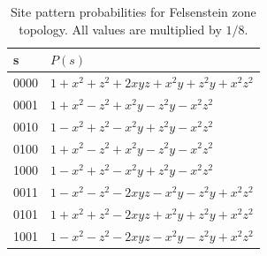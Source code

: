 \documentclass[a4paper]{article}
\begin{document}
\begin{table}
\centering
\begin{tabular}{|l|l|}
    \hline
s   &$P(s)$\\
    \hline
0000&$1+x^2+z^2+2xyz+x^2y+z^2y+x^2z^2$\\
0001&$1+x^2-z^2+x^2y-z^2y-x^2z^2$\\
0010&$1-x^2+z^2-x^2y+z^2y-x^2z^2$\\
0100&$1+x^2-z^2+x^2y-z^2y-x^2z^2$\\
1000&$1-x^2+z^2-x^2y+z^2y-x^2z^2$\\
0011&$1-x^2-z^2-2xyz-x^2y-z^2y+x^2z^2$\\
0101&$1+x^2+z^2-2xyz+x^2y+z^2y+x^2z^2$\\
1001&$1-x^2-z^2-2xyz-x^2y-z^2y+x^2z^2$\\
    \hline
\end{tabular}    
\caption{Site pattern probabilities for Felsenstein zone topology.
All values are multiplied by $1/8$.}
\label{tab:sitepatprob-fels}
\end{table}
\end{document}
